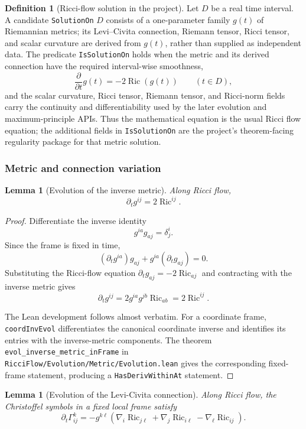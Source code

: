 \documentclass[11pt]{article}
\theoremstyle{plain}
\newtheorem{lemma}[theorem]{Lemma}
\theoremstyle{definition}
\newtheorem{definition}[theorem]{Definition}
\theoremstyle{remark}
\newcommand{\Ric}{\operatorname{Ric}}
\newcommand{\del}{\delta}
\newcommand{\leanref}[1]{\nolinkurl{#1}}
\newcommand{\leanfile}[1]{\nolinkurl{#1}}
\newcommand{\rffile}[1]{\leanfile{#1}}
\begin{document}
\begin{definition}[Ricci-flow solution in the project]
\label{def:project-ricci-flow-solution}
Let \(D\) be a real time interval.  A candidate
\leanref{SolutionOn} \(D\) consists of a one-parameter family \(g(t)\) of
Riemannian metrics; its Levi--Civita connection, Riemann tensor, Ricci tensor,
and scalar curvature are derived from \(g(t)\), rather than supplied as
independent data.  The predicate \leanref{IsSolutionOn} holds when the metric
and its derived connection have the required interval-wise smoothness,
\[
  \frac{\partial}{\partial t}g(t)=-2\Ric(g(t))
  \qquad (t\in D),
\]
and the scalar curvature, Ricci tensor, Riemann tensor, and Ricci-norm fields
carry the continuity and differentiability used by the later evolution and
maximum-principle APIs.  Thus the mathematical equation is the usual Ricci
flow equation; the additional fields in \leanref{IsSolutionOn} are the
project's theorem-facing regularity package for that metric solution.
\end{definition}

\subsubsection{Metric and connection variation}

\begin{lemma}[Evolution of the inverse metric]
\label{lem:evol-inverse-metric}
Along Ricci flow,
\[
  \partial_t g^{ij}=2\Ric^{ij}.
\]
\end{lemma}

\begin{proof}
Differentiate the inverse identity
\[
  g^{ia}g_{aj}=\del^i_j.
\]
Since the frame is fixed in time,
\[
  (\partial_t g^{ia})g_{aj}
  +g^{ia}(\partial_t g_{aj})=0.
\]
Substituting the Ricci-flow equation \(\partial_tg_{aj}=-2\Ric_{aj}\) and
contracting with the inverse metric gives
\[
  \partial_tg^{ij}
  =
  2g^{ia}g^{jb}\Ric_{ab}
  =
  2\Ric^{ij}.
\]

The Lean development follows almost verbatim.  For a coordinate frame,
\leanref{coordInvEvol} differentiates the canonical coordinate inverse and
identifies its entries with the inverse-metric components.  The theorem
\leanref{evol_inverse_metric_inFrame} in
\rffile{RicciFlow/Evolution/Metric/Evolution.lean} gives the corresponding
fixed-frame statement, producing a \texttt{HasDerivWithinAt} statement.
\end{proof}

\begin{lemma}[Evolution of the Levi-Civita connection]
\label{lem:evol-christoffel}
Along Ricci flow, the Christoffel symbols in a fixed local frame satisfy
\[
  \partial_t\Gamma^k_{ij}
  =
  -g^{k\ell}
  \left(
    \nabla_i\Ric_{j\ell}
    +
    \nabla_j\Ric_{i\ell}
    -
    \nabla_\ell\Ric_{ij}
  \right).
\]
\end{lemma}
\end{document}
